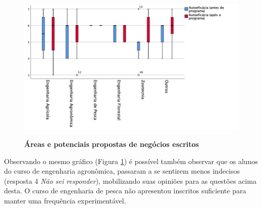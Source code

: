 \begin{figure}[!htb]
\centering
\caption{\textbf{Áreas e potenciais propostas de negócios escritos}}
\includegraphics[scale=0.5]{Imagens/boxplot_autoeficacia.png}
\label{figura_34}
\end{figure}
\newpage

Observando o mesmo gráfico (Figura \ref{figura_34}) é possível também observar que os alunos do curso de engenharia agronômica, passaram a se sentirem menos indecisos (resposta 4 \textit{Não sei responder}), mobilizando suas opiniões para as questões acima desta. O curso de engenharia de pesca não apresentou inscritos suficiente para manter uma frequência experimentável. 






